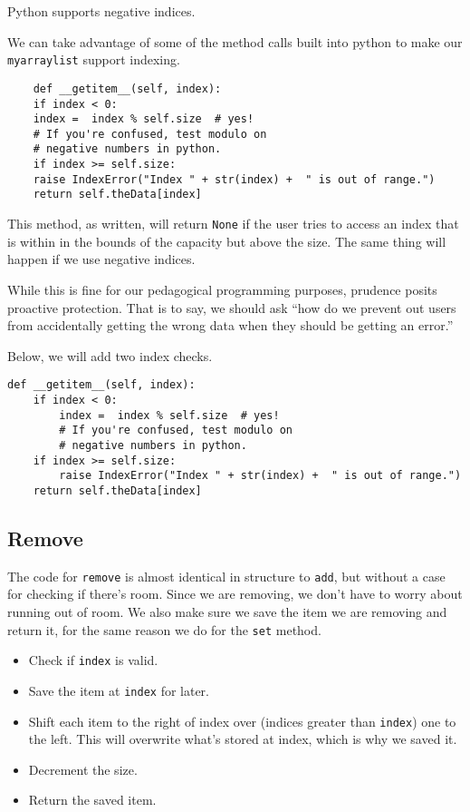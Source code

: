 Python supports negative indices.  

We can take advantage of some of the method calls built into python to make our \texttt{myarraylist} support indexing.

\begin{verbatim}
	def __getitem__(self, index):
	if index < 0: 
	index =  index % self.size  # yes! 
	# If you're confused, test modulo on 
	# negative numbers in python.
	if index >= self.size:
	raise IndexError("Index " + str(index) +  " is out of range.")       
	return self.theData[index]
\end{verbatim}



This method, as written, will return \texttt{None} if the user tries to access an index that is within in the bounds of the capacity but above the size.
The same thing will happen if we use negative indices.

While this is fine for our pedagogical programming purposes, prudence posits proactive protection.  That is to say, we should ask ``how do we prevent out users from accidentally getting the wrong data when they should be getting an error.''

Below, we will add two index checks.

\begin{verbatim}
def __getitem__(self, index):
	if index < 0: 
		index =  index % self.size  # yes! 
		# If you're confused, test modulo on 
		# negative numbers in python.
	if index >= self.size:
		raise IndexError("Index " + str(index) +  " is out of range.")       
	return self.theData[index]
\end{verbatim}


\subsection{Remove}


The code for \texttt{remove} is almost identical in structure to \texttt{add}, but without a case for checking if there's room.  Since we are removing, we don't have to worry about running out of room.  We also make sure we save the item we are removing and return it, for the same reason we do for the \texttt{set} method.
\begin{itemize}
	\item Check if \texttt{index} is valid.
	\item Save the item at \texttt{index} for later.
	\item Shift each item to the right of index over (indices greater than \texttt{index}) one to the left.  This will overwrite what's stored at index, which is why we saved it. 
	\item Decrement the size.
	\item Return the saved item.
	
\end{itemize}



